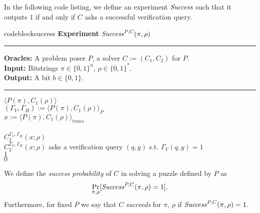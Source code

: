 In the following code listing, we define an experiment $\operatorname{\mathit{Success}}$ such that
it outputs $1$ if and only if $C$ asks a successful verification query.
%
\begin{restatable}{codeblock}{success}
  \textbf{Experiment} $\operatorname{\mathit{Success}}^{P, C}(\pi, \rho)$
  \medskip \hrule
  \textbf{Oracles:} A problem poser $P$, a solver $C := (C_1, C_2)$ for $P$.\\
  \textbf{Input:}  Bitstrings $\pi \in \{0,1\}^n$, $\rho \in \{0,1\}^*$.\\
  \textbf{Output:} A bit $b \in \{0,1\}$.
  \medskip\hrule
  \Run $\langle P(\pi), C_1(\rho) \rangle$ \\
  \IndI $(\Gamma_V, \Gamma_H) := \langle P(\pi), C_1(\rho) \rangle_{P}$ \\
  \IndI $x := \langle P(\pi), C_1(\rho) \rangle_{\mathit{trans}}$ \\ \\
  \Run $C_2^{\Gamma_V,\Gamma_H}(x; \rho)$ \\
  \IndI \If $C_2^{\Gamma_V, \Gamma_H}(x; \rho)$ asks a verification query $(q, y)$ s.t. $\Gamma_V(q, y) = 1$ \Then \\
  \IndII \Return $1$ \\
  \Return $0$
\end{restatable}
%
We define the \textit{success probability} of $C$ in solving a puzzle defined by $P$ as
\begin{align}
 \underset{\pi, \rho}{\Pr}[\operatorname{\mathit{Success}}^{P,C}(\pi, \rho) = 1].
\end{align}
Furthermore, for fixed $P$ we say that $C$ \textit{succeeds} for $\pi$, $\rho$ if $\operatorname{\mathit{Success}}^{P,C}(\pi, \rho) = 1$.

